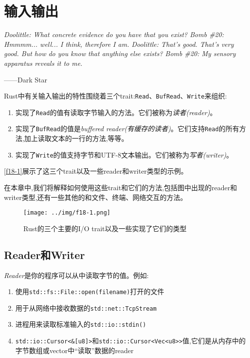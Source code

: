 \chapter{输入输出}\label{ch18}

\emph{Doolittle: What concrete evidence do you have that you exist?
Bomb \#20: Hmmmm... well... I think, therefore I am.
Doolittle: That’s good. That’s very good. But how do you know that anything else exists?
Bomb \#20: My sensory apparatus reveals it to me.}

\begin{flushright}
    ——Dark Star
\end{flushright}

Rust中有关输入输出的特性围绕着三个trait:\texttt{Read}、\texttt{BufRead}、\texttt{Write}来组织:
\begin{enumerate}
    \item 实现了\texttt{Read}的值有读取字节输入的方法。它们被称为\emph{读者(reader)}。
    \item 实现了\texttt{BufRead}的值是\emph{buffered reader(有缓存的读者)}。它们支持\texttt{Read}的所有方法,加上读取文本的一行的方法,等等。
    \item 实现了\texttt{Write}的值支持字节和UTF-8文本输出。它们被称为\emph{写者(writer)}。
\end{enumerate}

\autoref{f18-1}展示了这三个trait以及一些reader和writer类型的示例。

在本章中,我们将解释如何使用这些trait和它们的方法,包括图中出现的reader和writer类型,还有一些其他的和文件、终端、网络交互的方法。

\begin{figure}[htbp]
    \centering
    \texttt{[image: ../img/f18-1.png]}
    \caption{Rust的三个主要的I/O trait以及一些实现了它们的类型}
    \label{f18-1}
\end{figure}

\section{Reader和Writer}

\emph{Reader}是你的程序可以从中读取字节的值。例如:
\begin{enumerate}
    \item 使用\texttt{std::fs::File::open(filename)}打开的文件
    \item 用于从网络中接收数据的\texttt{std::net::TcpStream}
    \item 进程用来读取标准输入的\texttt{std::io::stdin()}
    \item \texttt{std::io::Cursor<\&[u8]>}和\texttt{std::io::Cursor<Vec<u8>>}值,它们是从内存中的字节数组或vector中“读取”数据的reader
\end{enumerate}

